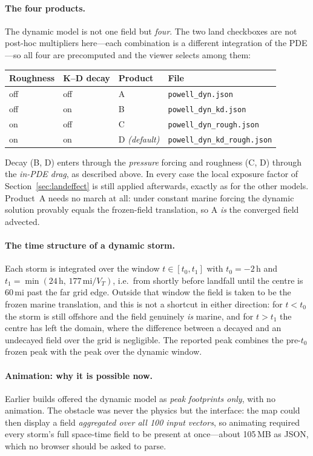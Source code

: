 \documentclass[11pt]{article}
\begin{document}
\paragraph{The four products.} The dynamic model is not one field but \emph{four}. The
two land checkboxes are not post-hoc multipliers here---each combination is a
different integration of the PDE---so all four are precomputed and the viewer selects
among them:
\begin{center}\small
\begin{tabular}{llll}
\toprule
Roughness & K--D decay & Product & File \\
\midrule
off & off & A & \texttt{powell\_dyn.json} \\
off & on  & B & \texttt{powell\_dyn\_kd.json} \\
on  & off & C & \texttt{powell\_dyn\_rough.json} \\
on  & on  & D \emph{(default)} & \texttt{powell\_dyn\_kd\_rough.json} \\
\bottomrule
\end{tabular}
\end{center}
Decay (B, D) enters through the \emph{pressure} forcing and roughness (C, D) through
the \emph{in-PDE drag}, as described above. In every case the local exposure factor of
Section~\ref{sec:landeffect} is still applied afterwards, exactly as for the other
models. Product~A needs no march at all: under constant marine forcing the dynamic
solution provably equals the frozen-field translation, so A \emph{is} the converged
field advected.

\paragraph{The time structure of a dynamic storm.} Each storm is integrated over the
window $t\in[t_0,t_1]$ with $t_0=-2$\,h and $t_1=\min(24\,\mathrm{h},\,177\,\mathrm{mi}/V_T)$,
i.e.\ from shortly before landfall until the centre is 60\,mi past the far grid edge.
Outside that window the field is taken to be the frozen marine translation, and this
is not a shortcut in either direction: for $t<t_0$ the storm is still offshore and the
field genuinely \emph{is} marine, and for $t>t_1$ the centre has left the domain, where
the difference between a decayed and an undecayed field over the grid is negligible.
The reported peak combines the pre-$t_0$ frozen peak with the peak over the dynamic
window.

\paragraph{Animation: why it is possible now.} Earlier builds offered the dynamic model
as \emph{peak footprints only}, with no animation. The obstacle was never the physics
but the interface: the map could then display a field \emph{aggregated over all 100
input vectors}, so animating required every storm's full space-time field to be present
at once---about 105\,MB as JSON, which no browser should be asked to parse.
\end{document}
